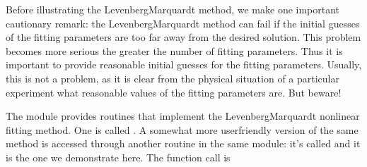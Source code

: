 \documentclass[letterpaper,10pt,english]{sphinxmanual}
\begin{document}
\sphinxAtStartPar
Before illustrating the Levenberg\sphinxhyphen{}Marquardt method, we make one important cautionary remark: the Levenberg\sphinxhyphen{}Marquardt method can fail if the initial guesses of the fitting parameters are too far away from the desired solution.  This problem becomes more serious the greater the number of fitting parameters.  Thus it is important to provide reasonable initial guesses for the fitting parameters.  Usually, this is not a problem, as it is clear from the physical situation of a particular experiment what reasonable values of the fitting parameters are.  But beware!

\sphinxAtStartPar
The  module provides routines that implement the Levenberg\sphinxhyphen{}Marquardt non\sphinxhyphen{}linear fitting method.  One is called .  A somewhat more user\sphinxhyphen{}friendly version of the same method is accessed through another routine in the same  module: it’s called  and it is the one we demonstrate here.  The function call is

\begin{sphinxVerbatim}[commandchars=\\\{\}]
 
\PYG{p}{[}    \PYG{p}{]}
    
\end{sphinxVerbatim}
\end{document}
